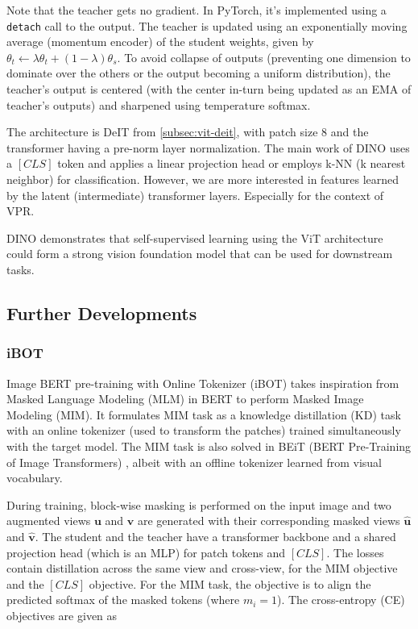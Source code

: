 Note that the teacher gets no gradient. In PyTorch, it's implemented
using a \texttt{detach} call to the output. The teacher is updated
using an exponentially moving average (momentum encoder)
\cite{He2019MomentumCF} of the student weights, given by $\theta_t
\leftarrow \lambda \theta_t + (1 - \lambda) \theta_s$. 
To avoid collapse of outputs (preventing one dimension to dominate
over the others or the output becoming a uniform distribution), the
teacher's output is centered (with the center in-turn being updated as
an EMA of teacher's outputs) and sharpened using temperature softmax.

The architecture is DeIT from \cref{subsec:vit-deit}, with patch size
8 and the transformer having a pre-norm layer normalization. The main
work of DINO uses a $\left[CLS\right]$ token and applies a linear
projection head or employs k-NN (k nearest neighbor) for
classification. However, we are more interested in features learned
by the latent (intermediate) transformer layers. Especially for the
context of VPR.

DINO demonstrates that self-supervised learning using the ViT
architecture could form a strong vision foundation model that can be
used for downstream tasks.

\subsection{Further Developments}

\subsubsection{iBOT}
\label{subsec:fm-ibot}

Image BERT pre-training with Online Tokenizer (iBOT)
\cite{Zhou2021iBOTIB} takes inspiration from Masked Language Modeling
(MLM) in BERT \cite{Devlin2019BERTPO} to perform Masked Image Modeling
(MIM). It formulates MIM task as a knowledge distillation (KD) task
with an online tokenizer (used to transform the patches) trained
simultaneously with the target model. The MIM task is also solved in
BEiT (BERT Pre-Training of Image Transformers) \cite{Bao2021BEiTBP},
albeit with an offline tokenizer learned from visual vocabulary.

During training, block-wise masking is performed on the input image
and two augmented views $\mathbf{u}$ and $\mathbf{v}$ are generated
with their corresponding masked views $\hat{\mathbf{u}}$ and
$\hat{\mathbf{v}}$. The student and the teacher have a transformer
backbone and a shared projection head (which is an MLP) for patch
tokens and $\left[CLS\right]$. The losses contain distillation across
the same view and cross-view, for the MIM objective and the
$\left[CLS\right]$ objective. For the MIM task, the objective is to
align the predicted softmax of the masked tokens (where $m_i = 1$).
The cross-entropy (CE) objectives are given as

